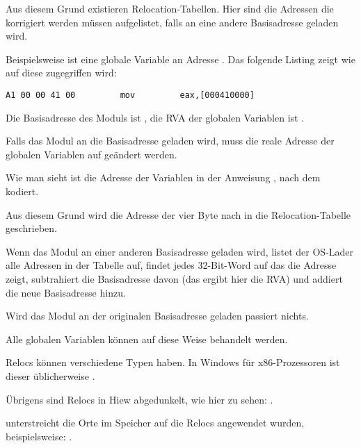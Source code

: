 Aus diesem Grund existieren Relocation-Tabellen. Hier sind die Adressen die korrigiert
werden müssen aufgelistet, falls an eine andere Basisadresse geladen wird.

Beispielsweise ist eine globale Variable an Adresse . Das folgende
Listing zeigt wie auf diese zugegriffen wird:

\begin{lstlisting}
A1 00 00 41 00         mov         eax,[000410000]
\end{lstlisting}

Die Basisadresse des Moduls ist , die \ac{RVA} der globalen Variablen
ist .

Falls das Modul an die Basisadresse  geladen wird, muss die reale
Adresse der globalen Variablen auf  geändert werden.


Wie man sieht ist die Adresse der Variablen in der Anweisung , nach dem
 kodiert.

Aus diesem Grund wird die Adresse der vier Byte nach  in die
Relocation-Tabelle geschrieben.

Wenn das Modul an einer anderen Basisadresse geladen wird, listet der \ac{OS}-Lader
alle Adressen in der Tabelle auf, findet jedes 32-Bit-Word auf das die Adresse zeigt,
subtrahiert die Basisadresse davon (das ergibt hier die \ac{RVA}) und addiert die
neue Basisadresse hinzu.

Wird das Modul an der originalen Basisadresse geladen passiert nichts.

Alle globalen Variablen können auf diese Weise behandelt werden.

Relocs können verschiedene Typen haben. In Windows für x86-Prozessoren ist dieser
üblicherweise .


Übrigens sind Relocs in Hiew abgedunkelt, wie hier zu sehen: .

\myindex{\olly}
\olly unterstreicht die Orte im Speicher auf die Relocs angewendet wurden,
beispielsweise: .

